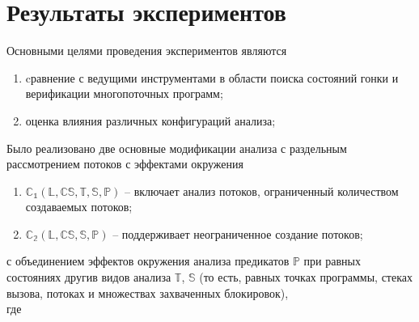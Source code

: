 \chapter{Результаты экспериментов}
\label{chapter_evaluation}

Основными целями проведения экспериментов являются 
\begin{enumerate}
\item cравнение с ведущими инструментами в области поиска состояний гонки и верификации многопоточных программ;
\item оценка влияния различных конфигураций анализа;
\end{enumerate}

Было реализовано две основные модификации анализа с раздельным рассмотрением потоков с эффектами окружения
\begin{enumerate}
\item $\mathbb{C_1}(\mathbb{L}, \mathbb{CS}, \mathbb{T}, \mathbb{S}, \mathbb{P})$ -- включает анализ потоков, ограниченный количеством создаваемых потоков;
\item $\mathbb{C_2}(\mathbb{L}, \mathbb{CS}, \mathbb{S}, \mathbb{P})$ -- поддерживает неограниченное создание потоков;
\end{enumerate}
с объединением эффектов окружения анализа предикатов $\mathbb{P}$ при равных состояниях другив видов анализа $\mathbb{T}$, $\mathbb{S}$
(то есть, равных точках программы, стеках вызова, потоках и множествах захваченных блокировок),\\
где

